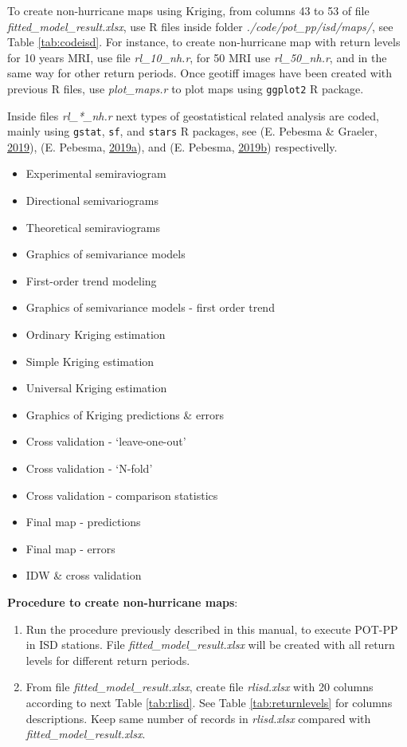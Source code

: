 \documentclass[12pt,oneside]{reedthesis}
\providecommand{\tightlist}{%
  \setlength{\itemsep}{0pt}\setlength{\parskip}{0pt}}
\begin{document}
To create non-hurricane maps using Kriging, from columns 43 to 53 of file \emph{fitted\_model\_result.xlsx}, use R files inside folder \emph{./code/pot\_pp/isd/maps/}, see Table \ref{tab:codeisd}. For instance, to create non-hurricane map with return levels for 10 years MRI, use file \emph{rl\_10\_nh.r}, for 50 MRI use \emph{rl\_50\_nh.r}, and in the same way for other return periods. Once geotiff images have been created with previous R files, use \emph{plot\_maps.r} to plot maps using \texttt{ggplot2} R package.

Inside files \emph{rl\_*\_nh.r} next types of geostatistical related analysis are coded, mainly using \texttt{gstat}, \texttt{sf}, and \texttt{stars} R packages, see (E. Pebesma \& Graeler, \protect\hyperlink{ref-Pebesma2019}{2019}), (E. Pebesma, \protect\hyperlink{ref-Pebesma2019a}{2019}\protect\hyperlink{ref-Pebesma2019a}{a}), and (E. Pebesma, \protect\hyperlink{ref-Pebesma2019b}{2019}\protect\hyperlink{ref-Pebesma2019b}{b}) respectivelly.
\begin{itemize}
\tightlist
\item
  Experimental semiraviogram
\item
  Directional semivariograms
\item
  Theoretical semiraviograms
\item
  Graphics of semivariance models
\item
  First-order trend modeling
\item
  Graphics of semivariance models - first order trend
\item
  Ordinary Kriging estimation
\item
  Simple Kriging estimation
\item
  Universal Kriging estimation
\item
  Graphics of Kriging predictions \& errors
\item
  Cross validation - `leave-one-out'
\item
  Cross validation - `N-fold'
\item
  Cross validation - comparison statistics
\item
  Final map - predictions
\item
  Final map - errors
\item
  IDW \& cross validation
\end{itemize}
\textbf{Procedure to create non-hurricane maps}:
\begin{enumerate}
\def\labelenumi{\arabic{enumi}.}
\item
  Run the procedure previously described in this manual, to execute POT-PP in ISD stations. File \emph{fitted\_model\_result.xlsx} will be created with all return levels for different return periods.
\item
  From file \emph{fitted\_model\_result.xlsx}, create file \emph{rlisd.xlsx} with 20 columns according to next Table \ref{tab:rlisd}. See Table \ref{tab:returnlevels} for columns descriptions. Keep same number of records in \emph{rlisd.xlsx} compared with \emph{fitted\_model\_result.xlsx}.
\end{enumerate}
\end{document}
